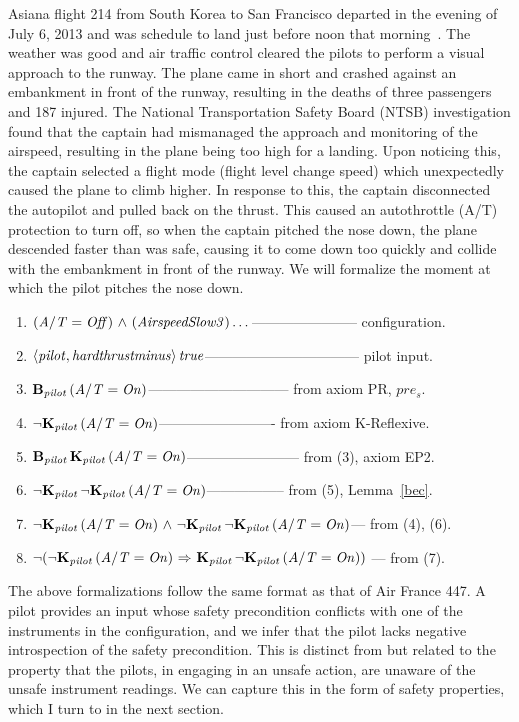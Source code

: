 Asiana flight 214 from South Korea to San Francisco departed in the evening of July 6, 2013 and was schedule to land just before noon that morning~\cite{asiana}. The weather was good and air traffic control cleared the pilots to perform a visual approach to the runway. The plane came in short and crashed against an embankment in front of the runway, resulting in the deaths of three passengers and 187 injured. The National Transportation Safety Board (NTSB) investigation found that the captain had mismanaged the approach and monitoring of the airspeed, resulting in the plane being too high for a landing. Upon noticing this, the captain selected a flight mode (flight level change speed) which unexpectedly caused the plane to climb higher. In response to this, the captain disconnected the autopilot and pulled back on the thrust. This caused an autothrottle (A/T) protection to turn off, so when the captain pitched the nose down, the plane descended faster than was safe, causing it to come down too quickly and collide with the embankment in front of the runway. We will formalize the moment at which the pilot pitches the nose down.
\begin{tcolorbox}	
	\begin{enumerate}
		\item $\mathit{(A/T=Off)} {\ \wedge \ } \mathit{(AirspeedSlow3)} \dots$----------------------- configuration.
		\item $\mathbf{\langle \mathit{pilot}, \mathit{hardthrustminus} \rangle}\,\mathit{true}$--------------------------------- pilot input.
		\item $\mathbf{B}_{\mathbf{\mathit{pilot}}}\,(\mathit{A/T=On})$------------------------------ from axiom PR, $\mathit{pre_s}$.
		\item ${\neg} \mathbf{K}_{\mathbf{\mathit{pilot}}}\,(\mathit{A/T=On})$------------------------- from axiom K-Reflexive.
		\item $\mathbf{B}_{\mathbf{\mathit{pilot}}}\,\mathbf{K}_{\mathbf{\mathit{pilot}}}\,(\mathit{A/T=On})$------------------------ from (3), axiom EP2.
		\item ${\neg} \mathbf{K}_{\mathbf{\mathit{pilot}}}\, {\neg} \mathbf{K}_{\mathbf{\mathit{pilot}}}\,(\mathit{A/T=On})$----------------- from (5), Lemma~\ref{bec}.
		\item ${\neg} \mathbf{K}_{\mathbf{\mathit{pilot}}}\,(\mathit{A/T=On}) {\ \wedge \ } {\neg} \mathbf{K}_{\mathbf{\mathit{pilot}}}\, {\neg} \mathbf{K}_{\mathbf{\mathit{pilot}}}\,(\mathit{A/T=On})$--- from (4), (6).
		\item ${\neg}({\neg} \mathbf{K}_{\mathbf{\mathit{pilot}}}\,(\mathit{A/T=On}) {\ \Rightarrow \ } \mathbf{K}_{\mathbf{\mathit{pilot}}}\, {\neg} \mathbf{K}_{\mathbf{\mathit{pilot}}}\,(\mathit{A/T=On}))$ --- from (7).
	\end{enumerate}
\end{tcolorbox}	
The above formalizations follow the same format as that of Air France 447. A pilot provides an input whose safety precondition conflicts with one of the instruments in the configuration, and we infer that the pilot lacks negative introspection of the safety precondition. This is distinct from but related to the property that the pilots, in engaging in an unsafe action, are unaware of the unsafe instrument readings. We can capture this in the form of safety properties, which I turn to in the next section.

